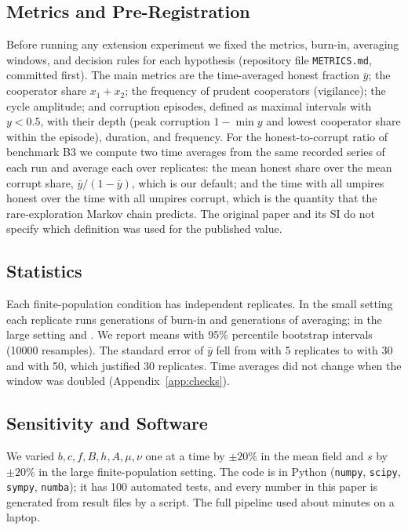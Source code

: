 \documentclass[journal]{IEEEtran}
\begin{document}
\subsection{Metrics and Pre-Registration}
Before running any extension experiment we fixed the metrics, burn-in, averaging windows, and
decision rules for each hypothesis (repository file \texttt{METRICS.md}, committed first). The
main metrics are the time-averaged honest fraction $\bar y$; the cooperator share $x_1+x_2$; the
frequency of prudent cooperators (vigilance); the cycle amplitude; and corruption episodes,
defined as maximal intervals with $y<0.5$, with their depth (peak corruption $1-\min y$ and lowest
cooperator share within the episode), duration, and frequency.
For the honest-to-corrupt ratio of benchmark B3 we compute two time averages from the same
recorded series of each run and average each over replicates: the mean honest share over the
mean corrupt share, $\bar y/(1-\bar y)$, which is our default; and the time with all umpires
honest over the time with all umpires corrupt, which is the quantity that the rare-exploration
Markov chain predicts. The original paper and its SI do not specify which definition was used
for the published value.

\subsection{Statistics}
Each finite-population condition has \Nreps{} independent replicates. In the small setting each
replicate runs \BurnSmall{} generations of burn-in and \WinSmall{} generations of averaging; in
the large setting \BurnLarge{} and \WinLarge{}. We report means with 95\% percentile bootstrap
intervals (10000 resamples). The standard error of $\bar y$ fell from \SEFive{} with 5
replicates to \SEThirty{} with 30 and \SEFifty{} with 50, which justified 30 replicates. Time
averages did not change when the window was doubled (Appendix~\ref{app:checks}).

\subsection{Sensitivity and Software}
We varied $b,c,f,B,h,A,\mu,\nu$ one at a time by $\pm20\%$ in the mean field and $s$ by $\pm20\%$
in the large finite-population setting. The code is in Python (\texttt{numpy}, \texttt{scipy},
\texttt{sympy}, \texttt{numba}); it has 100
automated tests, and every number in this paper is
generated from result files by a script. The full pipeline used about \RuntimeFullMin{} minutes
on a laptop.
\end{document}
